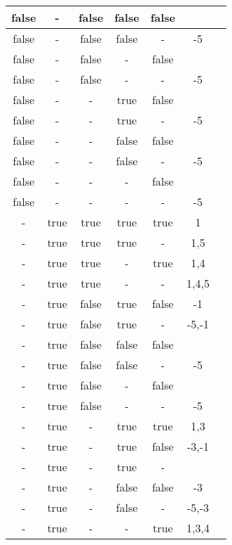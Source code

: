 \begin{longtable}{|c|c|c|c|c|c|c|}
false & - & false & false & false &                 &    \\ \hline 
false & - & false & false & - & -5              &    \\ \hline 
false & - & false & - & false &                 &    \\ \hline 
false & - & false & - & - & -5              &    \\ \hline 
false & - & - & true & false &                 &    \\ \hline 
false & - & - & true & - & -5              &    \\ \hline 
false & - & - & false & false &                 &    \\ \hline 
false & - & - & false & - & -5              &    \\ \hline 
false & - & - & - & false &                 &    \\ \hline 
false & - & - & - & - & -5              &    \\ \hline 
- & true & true & true & true & 1               &    \\ \hline 
- & true & true & true & - & 1,5             &    \\ \hline 
- & true & true & - & true & 1,4             &    \\ \hline 
- & true & true & - & - & 1,4,5           &    \\ \hline 
- & true & false & true & false & -1              &    \\ \hline 
- & true & false & true & - & -5,-1           &    \\ \hline 
- & true & false & false & false &                 &    \\ \hline 
- & true & false & false & - & -5              &    \\ \hline 
- & true & false & - & false &                 &    \\ \hline 
- & true & false & - & - & -5              &    \\ \hline 
- & true & - & true & true & 1,3             &    \\ \hline 
- & true & - & true & false & -3,-1           &    \\ \hline 
- & true & - & true & - &                 &    \\ \hline 
- & true & - & false & false & -3              &    \\ \hline 
- & true & - & false & - & -5,-3           &    \\ \hline 
- & true & - & - & true & 1,3,4           &    \\ \hline 

\end{longtable}
